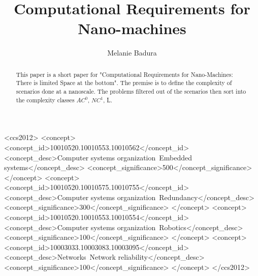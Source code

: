 \documentclass[10pt,sigconf]{acmart}
\begin{document}
\title{Computational Requirements for Nano-machines}

\author{Melanie Badura}




\renewcommand{\shortauthors}{M. Badura et al.}


\begin{abstract}
This paper is a short paper for "Computational Requirements for 
Nano-Machines: There is limited Space at the bottom"\cite{lau2017computational}.
The premise is to define the complexity of scenarios done at a nanoscale.
The problems filtered out of the scenarios then sort into the complexity classes $AC^0$, $NC^1$, L.
\end{abstract}

%
%
\begin{CCSXML}
<ccs2012>
 <concept>
  <concept_id>10010520.10010553.10010562</concept_id>
  <concept_desc>Computer systems organization~Embedded systems</concept_desc>
  <concept_significance>500</concept_significance>
 </concept>
 <concept>
  <concept_id>10010520.10010575.10010755</concept_id>
  <concept_desc>Computer systems organization~Redundancy</concept_desc>
  <concept_significance>300</concept_significance>
 </concept>
 <concept>
  <concept_id>10010520.10010553.10010554</concept_id>
  <concept_desc>Computer systems organization~Robotics</concept_desc>
  <concept_significance>100</concept_significance>
 </concept>
 <concept>
  <concept_id>10003033.10003083.10003095</concept_id>
  <concept_desc>Networks~Network reliability</concept_desc>
  <concept_significance>100</concept_significance>
 </concept>
</ccs2012>  
\end{CCSXML}




\end{document}
